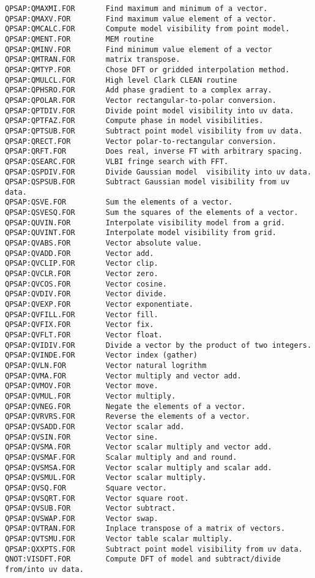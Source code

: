 \begin{verbatim}
QPSAP:QMAXMI.FOR       Find maximum and minimum of a vector.
QPSAP:QMAXV.FOR        Find maximum value element of a vector.
QPSAP:QMCALC.FOR       Compute model visibility from point model.
QPSAP:QMENT.FOR        MEM routine
QPSAP:QMINV.FOR        Find minimum value element of a vector
QPSAP:QMTRAN.FOR       matrix transpose.
QPSAP:QMTYP.FOR        Chose DFT or gridded interpolation method.
QPSAP:QMULCL.FOR       High level Clark CLEAN routine
QPSAP:QPHSRO.FOR       Add phase gradient to a complex array.
QPSAP:QPOLAR.FOR       Vector rectangular-to-polar conversion.
QPSAP:QPTDIV.FOR       Divide point model visibility into uv data.
QPSAP:QPTFAZ.FOR       Compute phase in model visibilities.
QPSAP:QPTSUB.FOR       Subtract point model visibility from uv data.
QPSAP:QRECT.FOR        Vector polar-to-rectangular conversion.
QPSAP:QRFT.FOR         Does real, inverse FT with arbitrary spacing.
QPSAP:QSEARC.FOR       VLBI fringe search with FFT.
QPSAP:QSPDIV.FOR       Divide Gaussian model  visibility into uv data.
QPSAP:QSPSUB.FOR       Subtract Gaussian model visibility from uv data.
QPSAP:QSVE.FOR         Sum the elements of a vector.
QPSAP:QSVESQ.FOR       Sum the squares of the elements of a vector.
QPSAP:QUVIN.FOR        Interpolate visibility model from a grid.
QPSAP:QUVINT.FOR       Interpolate model visibility from grid.
QPSAP:QVABS.FOR        Vector absolute value.
QPSAP:QVADD.FOR        Vector add.
QPSAP:QVCLIP.FOR       Vector clip.
QPSAP:QVCLR.FOR        Vector zero.
QPSAP:QVCOS.FOR        Vector cosine.
QPSAP:QVDIV.FOR        Vector divide.
QPSAP:QVEXP.FOR        Vector exponentiate.
QPSAP:QVFILL.FOR       Vector fill.
QPSAP:QVFIX.FOR        Vector fix.
QPSAP:QVFLT.FOR        Vector float.
QPSAP:QVIDIV.FOR       Divide a vector by the product of two integers.
QPSAP:QVINDE.FOR       Vector index (gather)
QPSAP:QVLN.FOR         Vector natural logrithm
QPSAP:QVMA.FOR         Vector multiply and vector add.
QPSAP:QVMOV.FOR        Vector move.
QPSAP:QVMUL.FOR        Vector multiply.
QPSAP:QVNEG.FOR        Negate the elements of a vector.
QPSAP:QVRVRS.FOR       Reverse the elements of a vector.
QPSAP:QVSADD.FOR       Vector scalar add.
QPSAP:QVSIN.FOR        Vector sine.
QPSAP:QVSMA.FOR        Vector scalar multiply and vector add.
QPSAP:QVSMAF.FOR       Scalar multiply and and round.
QPSAP:QVSMSA.FOR       Vector scalar multiply and scalar add.
QPSAP:QVSMUL.FOR       Vector scalar multiply.
QPSAP:QVSQ.FOR         Square vector.
QPSAP:QVSQRT.FOR       Vector square root.
QPSAP:QVSUB.FOR        Vector subtract.
QPSAP:QVSWAP.FOR       Vector swap.
QPSAP:QVTRAN.FOR       Inplace transpose of a matrix of vectors.
QPSAP:QVTSMU.FOR       Vector table scalar multiply.
QPSAP:QXXPTS.FOR       Subtract point model visibility from uv data.
QNOT:VISDFT.FOR        Compute DFT of model and subtract/divide from/into uv data.
\end{verbatim}
 
